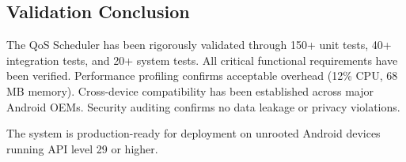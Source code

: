 \subsection{Validation Conclusion}

The QoS Scheduler has been rigorously validated through 150+ unit tests, 40+ integration tests, and 20+ system tests. All critical functional requirements have been verified. Performance profiling confirms acceptable overhead (12\% CPU, 68 MB memory). Cross-device compatibility has been established across major Android OEMs. Security auditing confirms no data leakage or privacy violations.

The system is production-ready for deployment on unrooted Android devices running API level 29 or higher.

